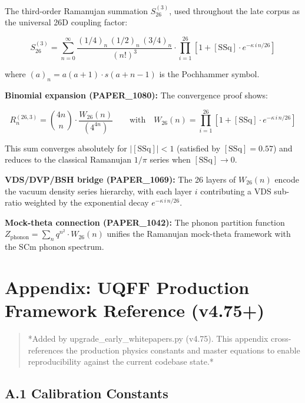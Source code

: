 \documentclass[12pt,a4paper]{article}
\begin{document}
The third-order Ramanujan summation $S_{26}^{(3)}$, used throughout the late corpus as the universal 26D coupling factor:

\begin{equation}
S_{26}^{(3)} = \sum_{n=0}^{\infty} \frac{(1/4)_n\,(1/2)_n\,(3/4)_n}{(n!)^3} \cdot \prod_{i=1}^{26}\left[1 + [\text{SSq}]\cdot e^{-\kappa\,i\,n/26}\right]
\end{equation}

where $(a)_n = a(a+1)\cdot s(a+n-1)$ is the Pochhammer symbol.

\textbf{Binomial expansion (PAPER\_1080):} The convergence proof shows:

\begin{equation}
R_n^{(26,3)} = \binom{4n}{n} \cdot \frac{W_{26}(n)}{(4^{4n})} \qquad \text{with}\quad W_{26}(n) = \prod_{i=1}^{26}\left[1 + [\text{SSq}]\cdot e^{-\kappa\,i\,n/26}\right]
\end{equation}

This sum converges absolutely for $|[\text{SSq}]| < 1$ (satisfied by $[\text{SSq}] = 0.57$) and reduces to the classical Ramanujan $1/\pi$ series when $[\text{SSq}] \to 0$.

\textbf{VDS/DVP/BSH bridge (PAPER\_1069):} The 26 layers of $W_{26}(n)$ encode the vacuum density series hierarchy, with each layer $i$ contributing a VDS sub-ratio weighted by the exponential decay $e^{-\kappa\,i\,n/26}$.

\textbf{Mock-theta connection (PAPER\_1042):} The phonon partition function $Z_{\text{phonon}} = \sum_n q^{n^2} \cdot W_{26}(n)$ unifies the Ramanujan mock-theta framework with the SCm phonon spectrum.

\section{Appendix: UQFF Production Framework Reference (v4.75+)}

\begin{quote}
*Added by upgrade\_{early\_whitepapers}.py (v4.75). This appendix cross-references
the production physics constants and master equations to enable reproducibility
against the current codebase state.*
\end{quote}

\subsection{A.1 Calibration Constants}
\end{document}
